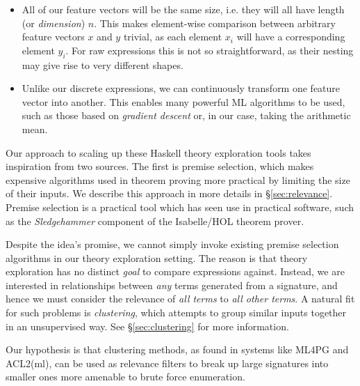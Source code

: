 \begin{itemize}
  \item All of our feature vectors will be the same size, i.e. they will all have length (or \emph{dimension}) $n$. This makes element-wise comparison between arbitrary feature vectors $x$ and $y$ trivial, as each element $x_i$ will have a corresponding element $y_i$. For raw expressions this is not so straightforward, as their nesting may give rise to very different shapes.
  \item Unlike our discrete expressions, we can continuously transform one feature vector into another. This enables many powerful ML algorithms to be used, such as those based on \emph{gradient descent} or, in our case, taking the arithmetic mean.
\end{itemize}

Our approach to scaling up these Haskell theory exploration tools takes inspiration from two sources. The first is premise selection, which makes expensive algorithms used in theorem proving more practical by limiting the size of their inputs. We describe this approach in more details in \S \ref{sec:relevance}. Premise selection is a practical tool which has seen use in practical software, such as the \emph{Sledgehammer} component of the Isabelle/HOL theorem prover.

Despite the idea's promise, we cannot simply invoke existing premise selection algorithms in our theory exploration setting. The reason is that theory exploration has no distinct \emph{goal} \iffalse TODO: implies that premise selection has a goal; rephrase: premise selection is given a concrete formula (called the ``goal'') to compare terms against \fi to compare expressions against. Instead, we are interested in relationships between \emph{any} terms generated from a signature, and hence we must consider the relevance of \emph{all terms} to \emph{all other terms}. A natural fit for such problems is \emph{clustering}, which attempts to group similar inputs together in an unsupervised way. See \S \ref{sec:clustering} for more information.

Our hypothesis is that clustering methods, as found in systems like ML4PG and ACL2(ml), can be used as relevance filters to break up large signatures into smaller ones more amenable to brute force enumeration.

\iffalse TODO: I would play up the clustering intelligence. Clustering is not just about breaking up, it is about discovering significant patterns in data. By forgetting this, you make motivation for your work sound too ``small'' \fi

